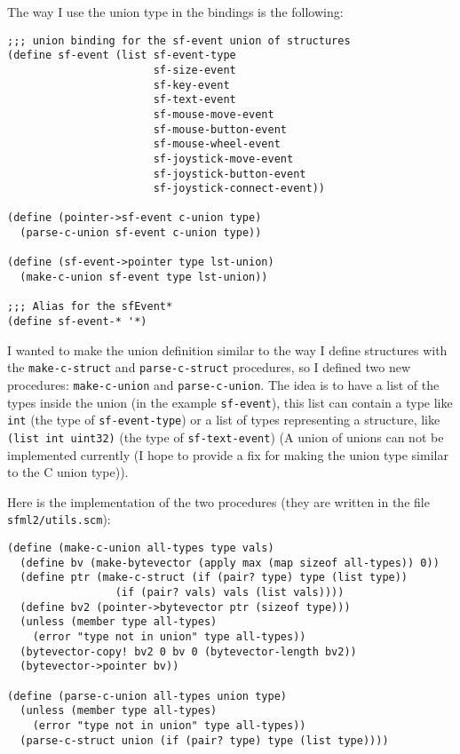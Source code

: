\documentclass[latterpaper, leqno]{article}
\begin{document}
\bigskip

The way I use the union type in the bindings is the following:

\begin{verbatim}
;;; union binding for the sf-event union of structures
(define sf-event (list sf-event-type
                       sf-size-event
                       sf-key-event
                       sf-text-event
                       sf-mouse-move-event
                       sf-mouse-button-event
                       sf-mouse-wheel-event
                       sf-joystick-move-event
                       sf-joystick-button-event
                       sf-joystick-connect-event))

(define (pointer->sf-event c-union type)
  (parse-c-union sf-event c-union type))

(define (sf-event->pointer type lst-union)
  (make-c-union sf-event type lst-union))

;;; Alias for the sfEvent*
(define sf-event-* '*)
\end{verbatim}

I wanted to make the union definition similar to the way I define structures with the \texttt{make-c-struct} and \texttt{parse-c-struct} procedures, so I defined two new procedures: \texttt{make-c-union} and \texttt{parse-c-union}. The idea is to have a list of the types inside the union (in the example \texttt{sf-event}), this list can contain a type like \texttt{int} (the type of \texttt{sf-event-type}) or a list of types representing a structure, like \texttt{(list int uint32)} (the type of \texttt{sf-text-event}) (A union of unions can not be implemented currently (I hope to provide a fix for making the union type similar to the C union type)).

\bigskip

Here is the implementation of the two procedures (they are written in the file \texttt{sfml2/utils.scm}):

\begin{verbatim}
(define (make-c-union all-types type vals)
  (define bv (make-bytevector (apply max (map sizeof all-types)) 0))
  (define ptr (make-c-struct (if (pair? type) type (list type))
			     (if (pair? vals) vals (list vals))))
  (define bv2 (pointer->bytevector ptr (sizeof type)))
  (unless (member type all-types)
    (error "type not in union" type all-types))
  (bytevector-copy! bv2 0 bv 0 (bytevector-length bv2))
  (bytevector->pointer bv))

(define (parse-c-union all-types union type)
  (unless (member type all-types)
    (error "type not in union" type all-types))
  (parse-c-struct union (if (pair? type) type (list type))))
\end{verbatim}
\end{document}
